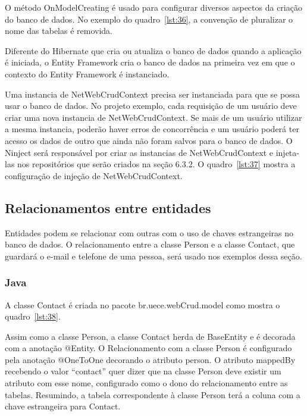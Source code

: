 \documentclass[a4paper,12pt]{article}
\newcommand{\javacode}[3] {
	
	\FloatBarrier
}
\newcommand{\sharpcode}[3] {
	
	\FloatBarrier
}
\begin{document}
O método OnModelCreating é usado para configurar diversos aspectos da criação do banco de dados.  No exemplo do quadro~\ref{lst:36}, a convenção de pluralizar o nome das tabelas é removida.

Diferente do Hibernate que cria ou atualiza o banco de dados quando a aplicação é iniciada, o Entity Framework cria o banco de dados na primeira vez em que o contexto do Entity Framework é instanciado.

Uma instancia de NetWebCrudContext precisa ser instanciada para que se possa usar o banco de dados. No projeto exemplo, cada requisição de um usuário deve criar uma nova instancia de NetWebCrudContext. Se mais de um usuário utilizar a mesma instancia, poderão haver erros de concorrência e um usuário poderá ter acesso os dados de outro que ainda não foram salvos para o banco de dados. O Ninject será responsável por criar as instancias de NetWebCrudContext e injeta-las nos repositórios que serão criados na seção 6.3.2. O quadro~\ref{lst:37} mostra a configuração de injeção de NetWebCrudContext.

\sharpcode{code/37.txt}{Injeção do contexto do banco de dados}{lst:37}

\subsection{Relacionamentos entre entidades}

Entidades podem se relacionar com outras com o uso de chaves estrangeiras no banco de dados. O relacionamento entre a classe Person e a classe Contact, que guardará o e-mail e telefone de uma pessoa, será usado nos exemplos dessa seção.

\subsubsection{Java}

A classe Contact é criada no pacote br.uece.webCrud.model como mostra o quadro~\ref{lst:38}.

\javacode{code/38.txt}{Classe Contact no projeto Java}{lst:38}

Assim como a classe Person, a classe Contact herda de BaseEntity e é decorada com a anotação @Entity. O Relacionamento com a classe Person é configurado pela anotação @OneToOne decorando o atributo person. O atributo mappedBy recebendo o valor “contact” quer dizer que na classe Person deve existir um atributo com esse nome, configurado como o dono do relacionamento entre as tabelas. Resumindo, a tabela correspondente à classe Person terá a coluna com a chave estrangeira para Contact.
\end{document}
